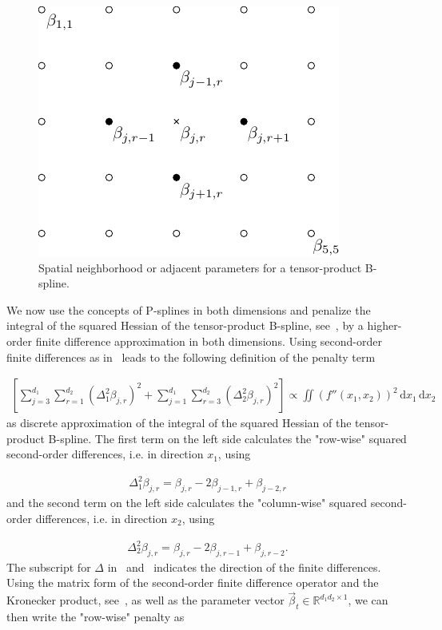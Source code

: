 \begin{figure}[H]
	\centering	
	\includegraphics{graphics/pgfplots/cha2/tps-spatial-neighborhood.pdf}
	\caption{Spatial neighborhood or adjacent parameters for a tensor-product B-spline.}
	\label{fig:tps-neighborhood}
\end{figure}
%
We now use the concepts of P-splines in both dimensions and penalize the integral of the squared Hessian of the tensor-product B-spline, see~, by a higher-order finite difference approximation in both dimensions. Using second-order finite differences as in~ leads to the following definition of the penalty term

\begin{align}
	\left[ \sum_{j=3}^{d_1} \sum_{r=1}^{d_2} (\Delta_1^2 \beta_{j,r})^2 + \sum_{j=1}^{d_1} \sum_{r=3}^{d_2} (\Delta_2^2 \beta_{j,r})^2 \right] \propto \iint \left(f''(x_1, x_2) \right)^2 \,\mathrm{d}x_1 \,\mathrm{d}x_2
\end{align}
%
as discrete approximation of the integral of the squared Hessian of the tensor-product B-spline. The first term on the left side calculates the "row-wise" squared second-order differences, i.e. in direction $x_1$, using

\begin{align} \label{eq:row-wise-diff-operator}
	\Delta_1^2 \beta_{j,r} = \beta_{j,r} - 2\beta_{j-1,r} + \beta_{j-2,r} 
\end{align}
%
and the second term on the left side calculates the "column-wise" squared second-order differences, i.e. in direction $x_2$, using

\begin{align} \label{eq:col-wise-diff-operator}
	\Delta_2^2 \beta_{j,r} = \beta_{j,r} -2\beta_{j,r-1} + \beta_{j,r-2}.
\end{align}
%
The subscript for $\Delta$ in~ and~ indicates the direction of the finite differences. Using the matrix form of the second-order finite difference operator and the Kronecker product, see~, as well as the parameter vector $\vec{\beta}_t \in \mathbb{R}^{d_1 d_2 \times 1}$, we can then write the "row-wise" penalty as

